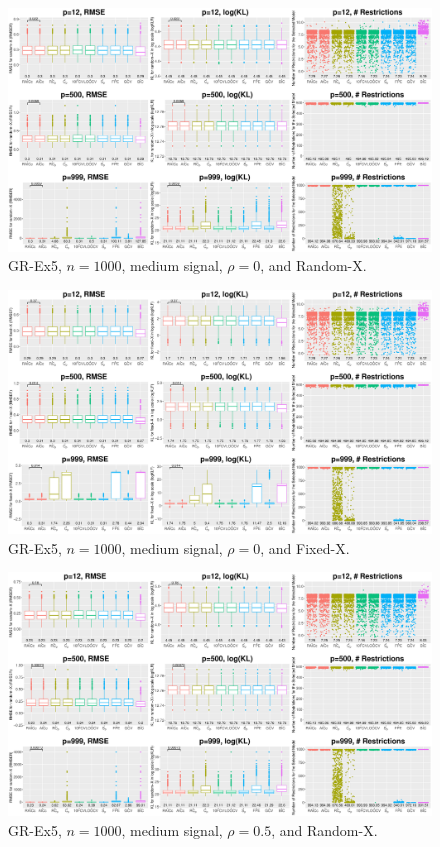 \clearpage
\begin{figure}[!ht]
\centering
\includegraphics[width=\textwidth]{figures/supplement/randomx_GR-Ex5_n1000_msnr_rho0.eps}
\caption{GR-Ex5, $n=1000$, medium signal, $\rho=0$, and Random-X.}
\end{figure}
\begin{figure}[!ht]
\centering
\includegraphics[width=\textwidth]{figures/supplement/fixedx_GR-Ex5_n1000_msnr_rho0.eps}
\caption{GR-Ex5, $n=1000$, medium signal, $\rho=0$, and Fixed-X.}
\end{figure}
\clearpage
\begin{figure}[!ht]
\centering
\includegraphics[width=\textwidth]{figures/supplement/randomx_GR-Ex5_n1000_msnr_rho05.eps}
\caption{GR-Ex5, $n=1000$, medium signal, $\rho=0.5$, and Random-X.}
\end{figure}
